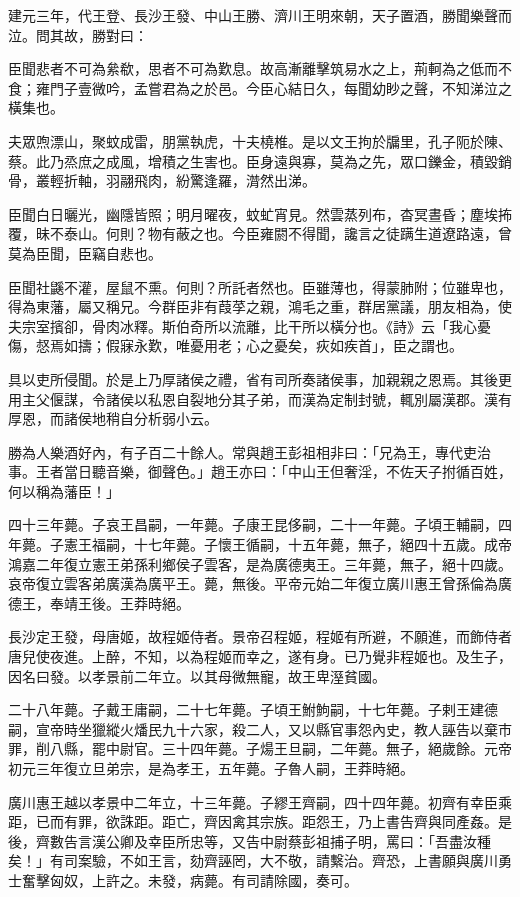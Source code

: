 \begin{pinyinscope}
建元三年，代王登、長沙王發、中山王勝、濟川王明來朝，天子置酒，勝聞樂聲而泣。問其故，勝對曰：

臣聞悲者不可為絫欷，思者不可為歎息。故高漸離擊筑易水之上，荊軻為之低而不食；雍門子壹微吟，孟嘗君為之於邑。今臣心結日久，每聞幼眇之聲，不知涕泣之橫集也。

夫眾喣漂山，聚蚊成雷，朋黨執虎，十夫橈椎。是以文王拘於牖里，孔子阨於陳、蔡。此乃烝庶之成風，增積之生害也。臣身遠與寡，莫為之先，眾口鑠金，積毀銷骨，叢輕折軸，羽翮飛肉，紛驚逢羅，潸然出涕。

臣聞白日曬光，幽隱皆照；明月曜夜，蚊虻宵見。然雲蒸列布，杳冥晝昏；塵埃抪覆，昧不泰山。何則？物有蔽之也。今臣雍閼不得聞，讒言之徒蹒生道遼路遠，曾莫為臣聞，臣竊自悲也。

臣聞社鼷不灌，屋鼠不熏。何則？所託者然也。臣雖薄也，得蒙肺附；位雖卑也，得為東藩，屬又稱兄。今群臣非有葭莩之親，鴻毛之重，群居黨議，朋友相為，使夫宗室擯卻，骨肉冰釋。斯伯奇所以流離，比干所以橫分也。《詩》云「我心憂傷，惄焉如擣；假寐永歎，唯憂用老；心之憂矣，疢如疾首」，臣之謂也。

具以吏所侵聞。於是上乃厚諸侯之禮，省有司所奏諸侯事，加親親之恩焉。其後更用主父偃謀，令諸侯以私恩自裂地分其子弟，而漢為定制封號，輒別屬漢郡。漢有厚恩，而諸侯地稍自分析弱小云。

勝為人樂酒好內，有子百二十餘人。常與趙王彭祖相非曰：「兄為王，專代吏治事。王者當日聽音樂，御聲色。」趙王亦曰：「中山王但奢淫，不佐天子拊循百姓，何以稱為藩臣！」

四十三年薨。子哀王昌嗣，一年薨。子康王昆侈嗣，二十一年薨。子頃王輔嗣，四年薨。子憲王福嗣，十七年薨。子懷王循嗣，十五年薨，無子，絕四十五歲。成帝鴻嘉二年復立憲王弟孫利鄉侯子雲客，是為廣德夷王。三年薨，無子，絕十四歲。哀帝復立雲客弟廣漢為廣平王。薨，無後。平帝元始二年復立廣川惠王曾孫倫為廣德王，奉靖王後。王莽時絕。

長沙定王發，母唐姬，故程姬侍者。景帝召程姬，程姬有所避，不願進，而飾侍者唐兒使夜進。上醉，不知，以為程姬而幸之，遂有身。已乃覺非程姬也。及生子，因名曰發。以孝景前二年立。以其母微無寵，故王卑溼貧國。

二十八年薨。子戴王庸嗣，二十七年薨。子頃王鮒鮈嗣，十七年薨。子剌王建德嗣，宣帝時坐獵縱火燔民九十六家，殺二人，又以縣官事怨內史，教人誣告以棄市罪，削八縣，罷中尉官。三十四年薨。子煬王旦嗣，二年薨。無子，絕歲餘。元帝初元三年復立旦弟宗，是為孝王，五年薨。子魯人嗣，王莽時絕。

廣川惠王越以孝景中二年立，十三年薨。子繆王齊嗣，四十四年薨。初齊有幸臣乘距，已而有罪，欲誅距。距亡，齊因禽其宗族。距怨王，乃上書告齊與同產姦。是後，齊數告言漢公卿及幸臣所忠等，又告中尉蔡彭祖捕子明，罵曰：「吾盡汝種矣！」有司案驗，不如王言，劾齊誣罔，大不敬，請繫治。齊恐，上書願與廣川勇士奮擊匈奴，上許之。未發，病薨。有司請除國，奏可。


\end{pinyinscope}
